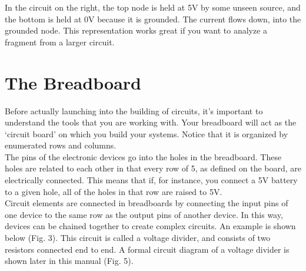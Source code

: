 \documentclass[12pt]{article}
\begin{document}
	In the circuit on the right, the top node is held at 5V by some unseen source, and the bottom is held at 0V because it is grounded. The current flows down, into the grounded node. This representation works great if you want to analyze a fragment from a larger circuit.
	
	\section{The Breadboard}
	
	Before actually launching into the building of circuits, it's important to understand the tools that you are working with. Your breadboard will act as the `circuit board' on which you build your systems. Notice that it is organized by enumerated rows and columns. \\
	
	The pins of the electronic devices go into the holes in the breadboard. These holes are related to each other in that every row of 5, as defined on the board, are electrically connected. This means that if, for instance, you connect a 5V battery to a given hole, all of the holes in that row are raised to 5V. \\
	
	Circuit elements are connected in breadboards by connecting the input pins of one device to the same row as the output pins of another device. In this way, devices can be chained together to create complex circuits. An example is shown below (Fig. 3). This circuit is called a voltage divider, and consists of two resistors connected end to end. A formal circuit diagram of a voltage divider is shown later in this manual (Fig. 5). \\
	
\end{document}
